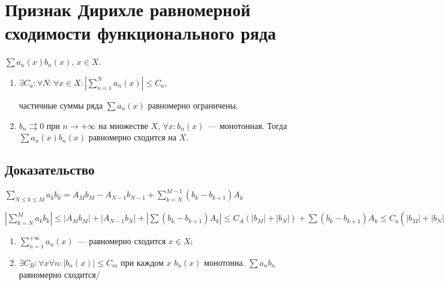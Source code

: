 \documentclass{article}
\begin{document}
    \section{Признак Дирихле равномерной сходимости функционального ряда}
    
        $\sum a_n(x) b_n(x)$, $x \in X$.
        
        \begin{enumerate}
        
            \item $\exists C_a : \forall N : \forall x \in X : \left| \sum\limits^N_{n = 1} a_n(x) \right| \leq C_a$, 
            
                частичные суммы ряда $\sum a_n(x)$ равномерно ограничены.
            
            \item $b_n \rightrightarrows 0$ при $n \rightarrow +\infty$ на множестве $X$, $\forall x : b_n(x)$~--- монотонная. Тогда $\sum a_n(x) b_n(x)$ равномерно сходится на $X$.
            
        \end{enumerate}
        
        \subsection{Доказательство}
        
            $\sum\limits_{N \leq k \leq M} a_k b_k = A_M b_M - A_{N - 1} b_{N - 1} + \sum\limits^{M - 1}_{k = N} (b_k - b_{k + 1}) A_k$
            
            $\left| \sum\limits^M_{k = N} a_k b_k \right| \leq |A_M b_M| + |A_{N - 1} b_N| + \left| \sum (b_k - b_{k + 1} ) A_k \right| \leq C_A \left( |b_M| + |b_N| \right) + \sum(b_k - b_{k + 1})A_k \leq C_a \left( | b_M | + | b_N | + \sum^{M - 1}_{k = N} (b_k - b_{k + 1}) \right) \leq C_a \left( |b_M| + |b_N| + |b_M| + |b_N| \right) \rightarrow c$
            
            \begin{enumerate}
            
                \item $\sum\limits^{+\infty}_{n = 1} a_n(x)$~--- равномерно сходится $x \in X$;
                
                \item $\exists C_B : \forall x \forall n : |b_n(x)| \leq C_m$ при каждом $x$ $b_n(x)$ монотонна. $\sum a_n b_n$ равномерно сходится/
                
            \end{enumerate}
            
\end{document}
